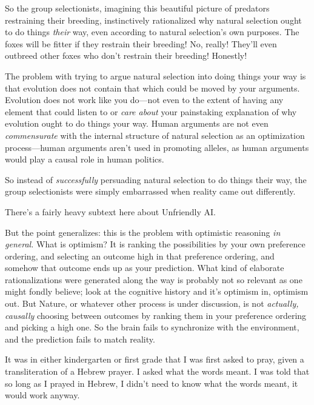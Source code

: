 { So the group selectionists, imagining this beautiful picture of
predators restraining their breeding, instinctively rationalized why
natural selection ought to do things \textit{their} way, even according
to natural selection's own purposes. The foxes will be
fitter if they restrain their breeding! No, really!
They'll even outbreed other foxes who
don't restrain their breeding! Honestly!


 The problem with trying to argue natural selection into doing
things your way is that evolution does not contain that which could be
moved by your arguments. Evolution does not work like you do---not even
to the extent of having any element that could listen to or
\textit{care about} your painstaking explanation of why evolution ought
to do things your way. Human arguments are not even
\textit{commensurate} with the internal structure of natural selection
as an optimization process---human arguments aren't
used in promoting alleles, as human arguments would play a causal role
in human politics.


 So instead of \textit{successfully} persuading natural selection
to do things their way, the group selectionists were simply embarrassed
when reality came out differently.


 There's a fairly heavy subtext here about
Unfriendly AI.


 But the point generalizes: this is the problem with optimistic
reasoning \textit{in general.} What is optimism? It is ranking the
possibilities by your own preference ordering, and selecting an outcome
high in that preference ordering, and somehow that outcome ends up as
your prediction. What kind of elaborate rationalizations were generated
along the way is probably not so relevant as one might fondly believe;
look at the cognitive history and it's optimism in,
optimism out. But Nature, or whatever other process is under
discussion, is not \textit{actually, causally} choosing between
outcomes by ranking them in your preference ordering and picking a high
one. So the brain fails to synchronize with the environment, and the
prediction fails to match reality.

\myendsectiontext


\bigskip



 It was in either kindergarten or first grade that I was first
asked to pray, given a transliteration of a Hebrew prayer. I asked what
the words meant. I was told that so long as I prayed in Hebrew, I
didn't need to know what the words meant, it would work
anyway. 


}
